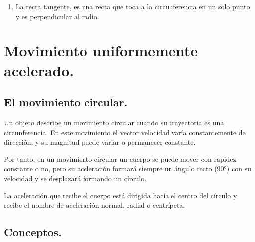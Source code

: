 \documentclass[14pt]{extarticle}
\begin{document}
\begin{enumerate}
\begin{figure}[H]
\begin{tikzpicture}[scale=0.8]
    \end{tikzpicture}
\end{figure}
\item La recta tangente, es una recta que toca a la circunferencia en un solo punto y es perpendicular al radio.
\begin{figure}[H]
    \centering
\end{figure}
\end{enumerate}

\section{Movimiento uniformemente acelerado.}

\subsection{El movimiento circular.}

Un objeto describe un movimiento circular cuando su trayectoria es una circunferencia. En este movimiento el vector velocidad varía constantemente de dirección, y su magnitud puede variar o permanecer constante.

Por tanto, en un movimiento circular un cuerpo se puede mover con rapidez constante o no, pero su aceleración formará siempre un ángulo recto (\ang{90}) con su velocidad y se desplazará formando un círculo.
    
La aceleración que recibe el cuerpo está dirigida hacia el centro del círculo y recibe el nombre de aceleración normal, radial o centrípeta.

\subsection{Conceptos.}
\end{document}
